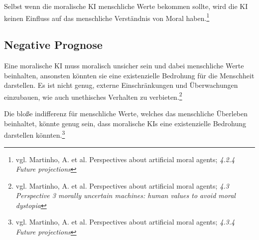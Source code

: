 Selbst wenn die moralische KI menschliche Werte bekommen sollte, wird die KI keinen
Einfluss auf das menschliche Verständnis von Moral haben.\footnote{vgl. Martinho, A. et al. Perspectives about artificial moral agents; \textit{4.2.4 Future projections}}

\subsection{Negative Prognose}\label{subsec::negative prognose}

Eine moralische KI muss moralisch unsicher sein und dabei menschliche Werte beinhalten, ansonsten
könnten sie eine existenzielle Bedrohung für die Menschheit darstellen.
Es ist nicht genug, externe Einschränkungen und Überwachungen einzubauen, wie auch unethisches Verhalten
zu verbieten.\footnote{vgl. Martinho, A. et al. Perspectives about artificial moral agents; \textit{4.3 Perspective 3 morally uncertain machines: human values to avoid moral dystopia}}

Die bloße indifferenz für menschliche Werte, welches das menschliche Überleben beinhaltet, könnte
genug sein, dass moralische KIs eine existenzielle Bedrohung darstellen könnten.\footnote{vgl. Martinho, A. et al. Perspectives about artificial moral agents; \textit{4.3.4 Future projections}}